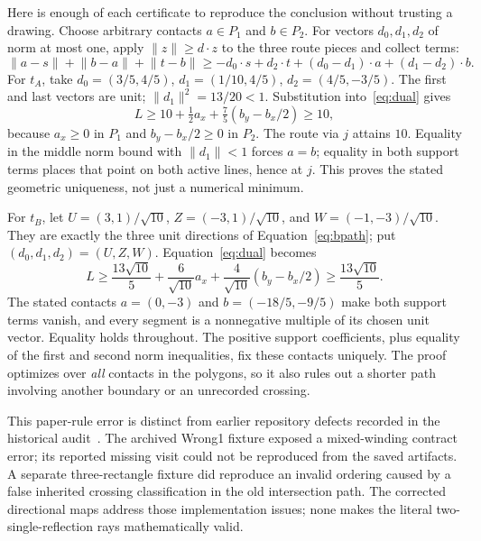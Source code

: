 \documentclass[12pt,a4paper]{article}
\newcommand{\norm}[1]{\lVert#1\rVert}
\begin{document}
Here is enough of each certificate to reproduce the conclusion without trusting a drawing. Choose arbitrary contacts \(a\in P_1\) and \(b\in P_2\). For vectors \(d_0,d_1,d_2\) of norm at most one, apply \(\norm z\ge d\cdot z\) to the three route pieces and collect terms:
\begin{equation}\label{eq:dual}
\norm{a-s}+\norm{b-a}+\norm{t-b}
\ge -d_0\cdot s+d_2\cdot t
 +(d_0-d_1)\cdot a+(d_1-d_2)\cdot b.
\end{equation}
For \(t_A\), take \(d_0=(3/5,4/5)\), \(d_1=(1/10,4/5)\), \(d_2=(4/5,-3/5)\). The first and last vectors are unit; \(\norm{d_1}^2=13/20<1\). Substitution into~\eqref{eq:dual} gives
\[
L\ge 10+\tfrac12a_x+\tfrac75(b_y-b_x/2)\ge10,
\]
because \(a_x\ge0\) in \(P_1\) and \(b_y-b_x/2\ge0\) in \(P_2\). The route via \(j\) attains \(10\). Equality in the middle norm bound with \(\norm{d_1}<1\) forces \(a=b\); equality in both support terms places that point on both active lines, hence at \(j\). This proves the stated geometric uniqueness, not just a numerical minimum.

For \(t_B\), let \(U=(3,1)/\sqrt{10}\), \(Z=(-3,1)/\sqrt{10}\), and \(W=(-1,-3)/\sqrt{10}\). They are exactly the three unit directions of Equation~\eqref{eq:bpath}; put \((d_0,d_1,d_2)=(U,Z,W)\). Equation~\eqref{eq:dual} becomes
\[
L\ge\frac{13\sqrt{10}}5
 +\frac6{\sqrt{10}}a_x
 +\frac4{\sqrt{10}}(b_y-b_x/2)
\ge\frac{13\sqrt{10}}5.
\]
The stated contacts \(a=(0,-3)\) and \(b=(-18/5,-9/5)\) make both support terms vanish, and every segment is a nonnegative multiple of its chosen unit vector. Equality holds throughout. The positive support coefficients, plus equality of the first and second norm inequalities, fix these contacts uniquely. The proof optimizes over \emph{all} contacts in the polygons, so it also rules out a shorter path involving another boundary or an unrecorded crossing.

This paper-rule error is distinct from earlier repository defects recorded in the historical audit~\cite{audit}. The archived Wrong1 fixture exposed a mixed-winding contract error; its reported missing visit could not be reproduced from the saved artifacts. A separate three-rectangle fixture did reproduce an invalid ordering caused by a false inherited crossing classification in the old intersection path. The corrected directional maps address those implementation issues; none makes the literal two-single-reflection rays mathematically valid.
\end{document}
